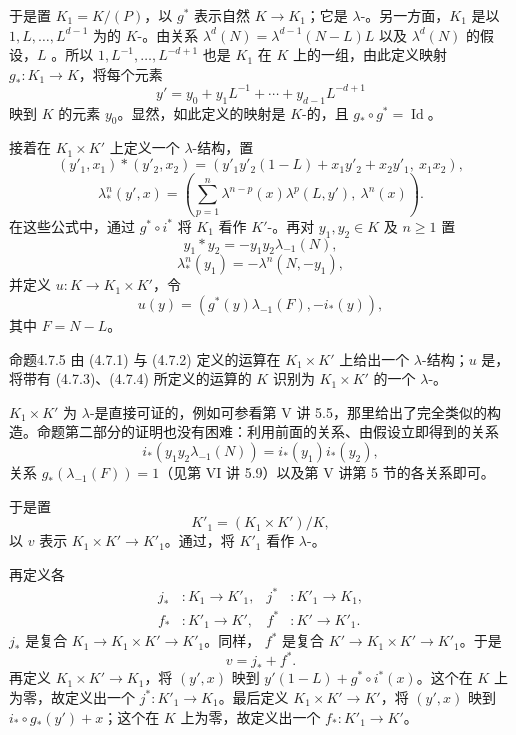于是置 $K_1=K/(P)$，以 $g^*$ 表示自然 $K\to K_1$；它是 $\lambda$-。另一方面，$K_1$ 是以 $1,L,\ldots,L^{d-1}$ 为的 $K$-。由关系 $\lambda^d(N)=\lambda^{d-1}(N-L)L$ 以及 $\lambda^d(N)$ 的假设，$L$ 。所以 $1,L^{-1},\ldots,L^{-d+1}$ 也是 $K_1$ 在 $K$ 上的一组，由此定义映射 $g_*:K_1\to K$，将每个元素
\[
y'=y_0+y_1L^{-1}+\cdots+y_{d-1}L^{-d+1}
\]
映到 $K$ 的元素 $y_0$。显然，如此定义的映射是 $K$-的，且 $g_*\circ g^*=\operatorname{Id}$。

接着在 $K_1\times K'$ 上定义一个 $\lambda$-结构，置
\[
(y'_1,x_1)*(y'_2,x_2)
=(y'_1y'_2(1-L)+x_1y'_2+x_2y'_1,\ x_1x_2),\tag{4.7.1}
\]
\[
\lambda_*^n(y',x)=\left(\sum_{p=1}^n\lambda^{n-p}(x)\lambda^p(L,y'),\ \lambda^n(x)\right).\tag{4.7.2}
\]
在这些公式中，通过 $g^*\circ i^*$ 将 $K_1$ 看作 $K'$-。再对 $y_1,y_2\in K$ 及 $n\geq1$ 置
\[
y_1*y_2=-y_1y_2\lambda_{-1}(N),\tag{4.7.3}
\]
\[
\lambda_*^n(y_1)=-\lambda^n(N,-y_1),\tag{4.7.4}
\]
并定义 $u:K\to K_1\times K'$，令
\[
u(y)=(g^*(y)\lambda_{-1}(F),-i_*(y)),
\]
其中 $F=N-L$。

\begin{SGAresult}{命题}{4.7.5}
由 (4.7.1) 与 (4.7.2) 定义的运算在 $K_1\times K'$ 上给出一个 $\lambda$-结构；$u$ 是，将带有 (4.7.3)、(4.7.4) 所定义的运算的 $K$ 识别为 $K_1\times K'$ 的一个 $\lambda$-。
\end{SGAresult}
$K_1\times K'$ 为 $\lambda$-是直接可证的，例如可参看第 V 讲 5.5，那里给出了完全类似的构造。命题第二部分的证明也没有困难：利用前面的关系、由假设立即得到的关系
\[
i_*(y_1y_2\lambda_{-1}(N))=i_*(y_1)i_*(y_2),
\]
关系 $g_*(\lambda_{-1}(F))=1$（见第 VI 讲 5.9）以及第 V 讲第 5 节的各关系即可。

于是置
\[
K'_1=(K_1\times K')/K,
\]
以 $v$ 表示 $K_1\times K'\to K'_1$。通过，将 $K'_1$ 看作 $\lambda$-。

再定义各
\[
\begin{aligned}
j_* &:K_1\longrightarrow K'_1,&j^* &:K'_1\longrightarrow K_1,\\
f_* &:K'_1\longrightarrow K',&f^* &:K'\longrightarrow K'_1.
\end{aligned}
\]
 $j_*$ 是复合 $K_1\to K_1\times K'\to K'_1$。同样， $f^*$ 是复合 $K'\to K_1\times K'\to K'_1$。于是
\[
v=j_*+f^*.
\]
再定义 $K_1\times K'\to K_1$，将 $(y',x)$ 映到 $y'(1-L)+g^*\circ i^*(x)$。这个在 $K$ 上为零，故定义出一个 $j^*:K'_1\to K_1$。最后定义 $K_1\times K'\to K'$，将 $(y',x)$ 映到 $i_*\circ g_*(y')+x$；这个在 $K$ 上为零，故定义出一个 $f_*:K'_1\to K'$。

